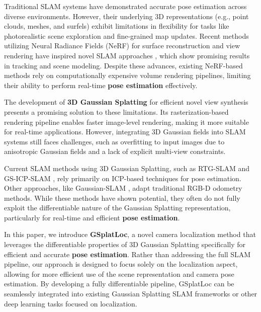 \documentclass[twocolumn]{article} %
\begin{document}
Traditional SLAM systems \cite{kerlDenseVisualSLAM2013} have
demonstrated accurate pose estimation across diverse environments.
However, their underlying 3D representations (e.g., point clouds,
meshes, and surfels) exhibit
limitations\cite{newcombeKinectfusionRealtimeDense2011,rusinkiewiczEfficientVariantsICP2001}
in flexibility for tasks like photorealistic scene exploration and
fine-grained map updates. Recent methods utilizing Neural Radiance
Fields (NeRF) \cite{mildenhallNeRFRepresentingScenes2022} for
surface reconstruction and view rendering have inspired novel SLAM
approaches \cite{sandstromPointslamDenseNeural2023}, which show
promising\cite{sucarImapImplicitMapping2021,zhuNiceslamNeuralImplicit2022}
results in tracking and scene modeling. Despite these
advances\cite{garbinFastnerfHighfidelityNeural2021}, existing
NeRF-based methods rely on computationally expensive volume rendering
pipelines, limiting their ability to perform real-time \textbf{pose
estimation} effectively.

The development of \textbf{3D Gaussian Splatting}
\cite{kerbl3DGaussianSplatting2023} for efficient novel view
synthesis presents a promising solution to these limitations. Its
rasterization-based rendering pipeline enables faster image-level
rendering, making it more suitable for real-time applications. However,
integrating 3D Gaussian fields into SLAM systems still faces challenges,
such as overfitting to input images due to anisotropic Gaussian fields
and a lack of explicit multi-view constraints.

Current SLAM methods using 3D Gaussian Splatting, such as RTG-SLAM
\cite{pengRTGSLAMRealtime3D2024} and GS-ICP-SLAM
\cite{haRGBDGSICPSLAM2024}, rely primarily on ICP-based techniques
for pose estimation. Other approaches, like Gaussian-SLAM
\cite{yugayGaussianSLAMPhotorealisticDense2024}, adapt traditional
RGB-D odometry methods. While these methods have shown potential, they
often do not fully exploit the differentiable nature of the Gaussian
Splatting representation, particularly for real-time and efficient
\textbf{pose estimation}.

In this paper, we introduce \textbf{GSplatLoc}, a novel camera
localization method that leverages the differentiable properties of 3D
Gaussian Splatting specifically for efficient and accurate \textbf{pose
estimation}. Rather than addressing the full SLAM pipeline, our approach
is designed to focus solely on the localization aspect, allowing for
more efficient use of the scene representation and camera pose
estimation. By developing a fully differentiable pipeline, GSplatLoc can
be seamlessly integrated into existing Gaussian Splatting SLAM
frameworks or other deep learning tasks focused on localization.
\end{document}

